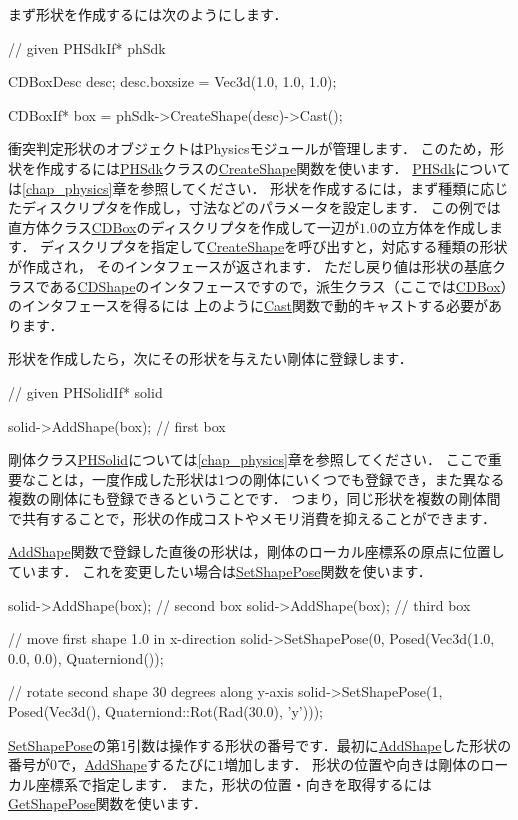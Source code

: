 \KLUDGE まず形状を作成するには次のようにします．
\begin{sourcecode}
// given PHSdkIf* phSdk

CDBoxDesc desc;
desc.boxsize = Vec3d(1.0, 1.0, 1.0);

CDBoxIf* box = phSdk->CreateShape(desc)->Cast();
\end{sourcecode}
\KLUDGE 衝突判定形状のオブジェクトはPhysics\KLUDGE モジュールが管理します．
\KLUDGE このため，形状を作成するには\url{PHSdk}\KLUDGE クラスの\url{CreateShape}\KLUDGE 関数を使います．
\url{PHSdk}\KLUDGE については\ref{chap_physics}\KLUDGE 章を参照してください．
\KLUDGE 形状を作成するには，まず種類に応じたディスクリプタを作成し，寸法などのパラメータを設定します．
\KLUDGE この例では直方体クラス\url{CDBox}\KLUDGE のディスクリプタを作成して一辺が$1.0$\KLUDGE の立方体を作成します．
\KLUDGE ディスクリプタを指定して\url{CreateShape}\KLUDGE を呼び出すと，対応する種類の形状が作成され，
\KLUDGE そのインタフェースが返されます．
\KLUDGE ただし戻り値は形状の基底クラスである\url{CDShape}\KLUDGE のインタフェースですので，派生クラス（ここでは\url{CDBox}\KLUDGE ）のインタフェースを得るには
\KLUDGE 上のように\url{Cast}\KLUDGE 関数で動的キャストする必要があります．

\KLUDGE 形状を作成したら，次にその形状を与えたい剛体に登録します．
\begin{sourcecode}
// given PHSolidIf* solid

solid->AddShape(box);         // first box
\end{sourcecode}
\KLUDGE 剛体クラス\url{PHSolid}\KLUDGE については\ref{chap_physics}\KLUDGE 章を参照してください．
\KLUDGE ここで重要なことは，一度作成した形状は1\KLUDGE つの剛体にいくつでも登録でき，また異なる複数の剛体にも登録できるということです．
\KLUDGE つまり，同じ形状を複数の剛体間で共有することで，形状の作成コストやメモリ消費を抑えることができます．

\url{AddShape}\KLUDGE 関数で登録した直後の形状は，剛体のローカル座標系の原点に位置しています．
\KLUDGE これを変更したい場合は\url{SetShapePose}\KLUDGE 関数を使います．
\begin{sourcecode}
solid->AddShape(box);         // second box
solid->AddShape(box);         // third box 

// move first shape 1.0 in x-direction
solid->SetShapePose(0, Posed(Vec3d(1.0, 0.0, 0.0), Quaterniond());

// rotate second shape 30 degrees along y-axis
solid->SetShapePose(1, Posed(Vec3d(),
                    Quaterniond::Rot(Rad(30.0), 'y')));
\end{sourcecode}
\url{SetShapePose}\KLUDGE の第1\KLUDGE 引数は操作する形状の番号です．最初に\url{AddShape}\KLUDGE した形状の番号が$0$\KLUDGE で，\url{AddShape}\KLUDGE するたびに$1$\KLUDGE 増加します．
\KLUDGE 形状の位置や向きは剛体のローカル座標系で指定します．
\KLUDGE また，形状の位置・向きを取得するには\url{GetShapePose}\KLUDGE 関数を使います．

